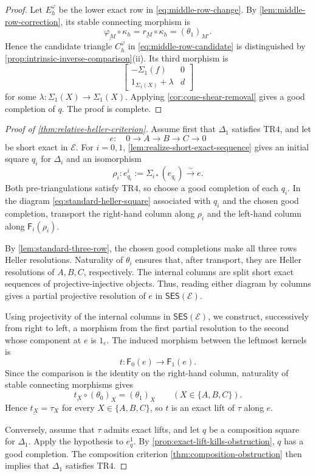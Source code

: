 \documentclass[a4paper,11pt,reqno]{amsart}
\theoremstyle{definition}
\theoremstyle{plain}
\numberwithin{equation}{section}
\begin{document}
\begin{proof}
Let \(E_h^\varphi\) be the lower exact row in
\eqref{eq:middle-row-change}.  By \cref{lem:middle-row-correction}, its stable
connecting morphism is
\[
 \underline{\varphi_M}\circ\kappa_h
 =\underline{r_M}\circ\kappa_h
 =(\theta_1)_{M'}.
\]
Hence the candidate triangle \(C_h^\varphi\) in
\eqref{eq:middle-row-candidate} is distinguished by
\cref{prop:intrinsic-inverse-comparison}\textup{(ii)}.  Its third morphism is
\[
 \begin{bmatrix}
  -\Sigma_1(f)&0\\
  1_{\Sigma_1(X)}+\lambda&d
 \end{bmatrix}
\]
for some \(\lambda:\Sigma_1(X)\to\Sigma_1(X)\).  Applying
\cref{cor:cone-shear-removal} gives a good completion of \(q\).  The
proof is complete.
\end{proof}

\begin{proof}[Proof of \cref{thm:relative-heller-criterion}]
Assume first that \(\Delta_1\) satisfies \(\mathrm{TR4}\), and let
\[
e:\quad0\longrightarrow A\longrightarrow B\longrightarrow C
\longrightarrow0
\]
be short exact in \(\mathcal E\). For \(i=0,1\),
\cref{lem:realize-short-exact-sequence} gives an initial square \(q_i\)
for \(\Delta_i\) and an isomorphism
\[
\rho_i:e_{q_i}^i:=\Sigma_{i*}(e_{q_i})\xrightarrow{\sim}e.
\]
Both pre-triangulations satisfy \(\mathrm{TR4}\), so choose a good
completion of each \(q_i\). In the diagram \eqref{eq:standard-heller-square} associated with
\(q_i\) and the chosen good completion, transport the right-hand
column along \(\rho_i\) and the left-hand column along
\(\mathsf F_i(\rho_i)\).

By \cref{lem:standard-three-row}, the chosen good completions make
all three rows Heller resolutions. Naturality of \(\theta_i\) ensures
that, after transport, they are Heller resolutions of \(A,B,C\),
respectively. The internal columns are split short exact sequences of
projective-injective objects. Thus, reading either diagram by columns
gives a partial projective resolution of \(e\) in
\(\mathsf{SES}(\mathcal E)\).

Using projectivity of the internal columns in
\(\mathsf{SES}(\mathcal E)\), we construct, successively from right
to left, a morphism from the first partial resolution to the second
whose component at \(e\) is \(1_e\). The induced morphism between
the leftmost kernels is
\[
t:\mathsf F_0(e)\longrightarrow\mathsf F_1(e).
\]
Since the comparison is the identity on the right-hand column,
naturality of stable connecting morphisms gives
\[
\underline{t_X}\circ(\theta_0)_X=(\theta_1)_X
\qquad(X\in\{A,B,C\}).
\]
Hence \(\underline{t_X}=\tau_X\) for every \(X\in\{A,B,C\}\), so \(t\)
is an exact lift of \(\tau\) along \(e\).

Conversely, assume that \(\tau\) admits exact lifts, and let \(q\) be a
composition square for \(\Delta_1\).  Apply the hypothesis to \(e_q^1\).
By \cref{prop:exact-lift-kills-obstruction}, \(q\) has a good completion.
The composition criterion \cref{thm:composition-obstruction} then implies
that \(\Delta_1\) satisfies \(\mathrm{TR4}\).
\end{proof}
\end{document}
